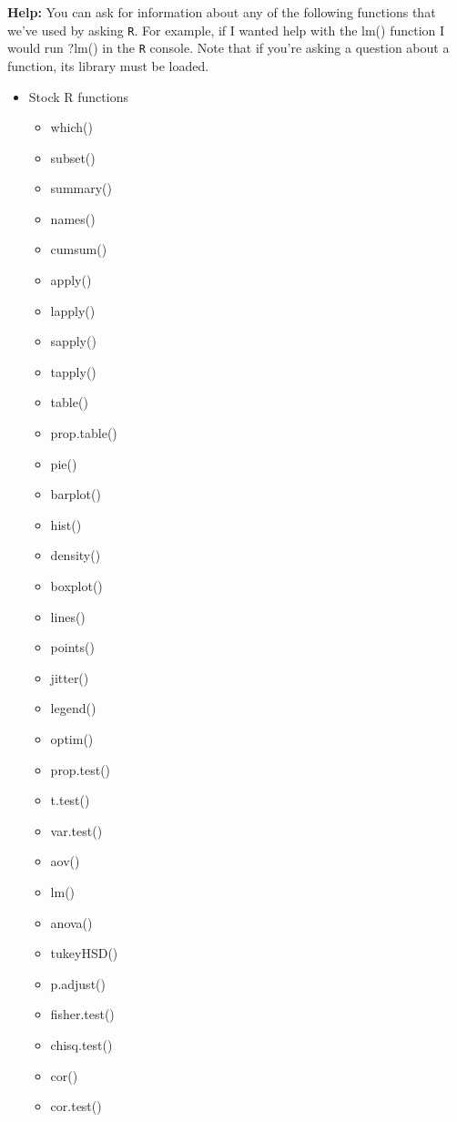 \documentclass{article}
\begin{document}
\textbf{Help:}
You can ask for information about any of the following functions that we've used by
asking \texttt{R}. For example, if I wanted help with the lm() function I would 
run ?lm() in the \texttt{R} console. Note that if you're asking a question about 
a function, its library must be loaded.\\
\begin{multicols}{3} \small
\begin{itemize}
  \item Stock R functions
  \begin{itemize}
    \item which()
    \item subset()
    \item summary()
    \item names()
    \item cumsum()
    \item apply()
    \item lapply()
    \item sapply()
    \item tapply()
    \item table()
    \item prop.table()
    \item pie()
    \item barplot()
    \item hist()
    \item density()
    \item boxplot()
    \item lines()
    \item points()
    \item jitter()
    \item legend()
    \item optim()
    \item prop.test()
    \item t.test()
    \item var.test()
    \item aov()
    \item lm()
    \item anova()
    \item tukeyHSD()
    \item p.adjust()
    \item fisher.test()
    \item chisq.test()
    \item cor()
    \item cor.test()
  \end{itemize}

\end{itemize}
\end{multicols}
\end{document}
